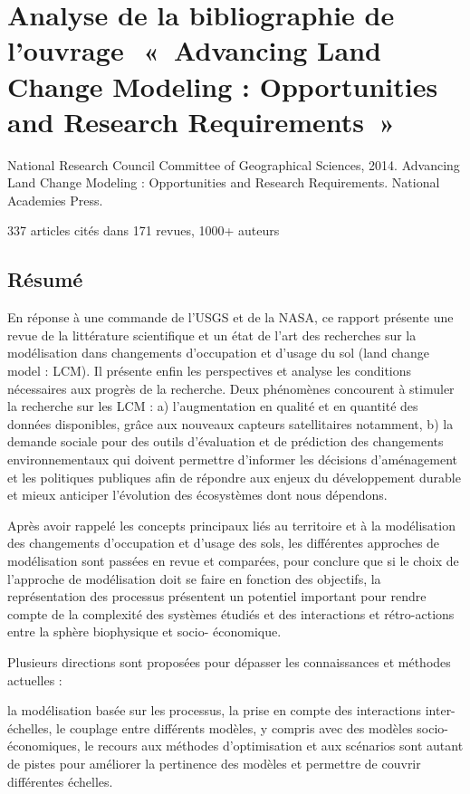\section
{Analyse de la bibliographie de l’ouvrage  « Advancing Land Change Modeling :
 Opportunities and Research Requirements »}

National Research Council Committee of Geographical Sciences, 2014. Advancing Land Change Modeling :
Opportunities and Research Requirements. National Academies Press.

337 articles cités dans 171 revues, 1000+ auteurs

\subsection{Résumé}

En réponse à une commande de l’USGS et de la NASA, ce rapport présente une
revue de la littérature scientifique et un état de l’art des recherches sur la
modélisation dans changements d’occupation et d’usage du sol (land change
model : LCM). Il présente enfin les perspectives et analyse les conditions
nécessaires aux progrès de la recherche. Deux phénomènes concourent à stimuler
la recherche sur les LCM :
a) l’augmentation en qualité et en quantité des
données disponibles, grâce aux nouveaux capteurs satellitaires notamment,
b)
la demande sociale pour des outils d’évaluation et de prédiction des
changements environnementaux qui doivent permettre d’informer les décisions
d’aménagement et les politiques publiques afin de répondre aux enjeux du
développement durable et mieux anticiper l’évolution des écosystèmes dont nous
dépendons.

Après avoir rappelé les concepts principaux liés au territoire et à
la modélisation des changements d’occupation et d’usage des sols, les
différentes approches de modélisation sont passées en revue et comparées, pour
conclure que si le choix de l’approche de modélisation doit se faire en
fonction  des objectifs, la représentation des processus présentent un
potentiel important pour rendre compte de la complexité des systèmes étudiés
et des interactions et rétro-actions entre la sphère biophysique et socio-
économique.

Plusieurs directions sont proposées pour dépasser les
connaissances et méthodes actuelles :

\startitemize[n]

\item la modélisation basée sur les processus,
la prise en compte des interactions inter-échelles, le couplage entre
différents modèles, y compris avec des modèles socio-économiques, le recours
aux méthodes d’optimisation et aux scénarios sont autant de pistes pour
améliorer la pertinence des modèles et permettre de couvrir différentes
échelles.

